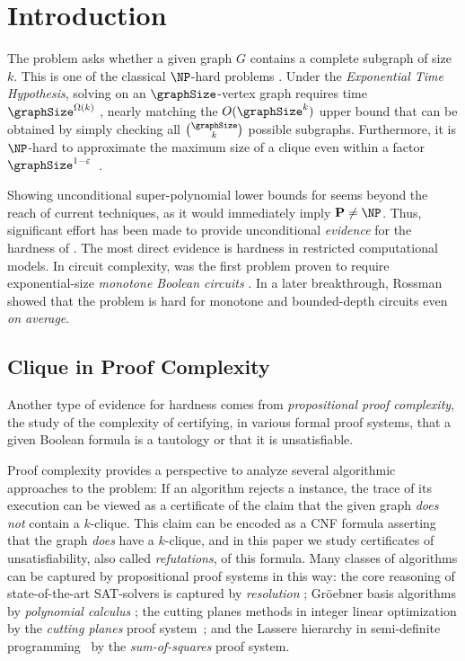 \section{Introduction}
\label{sec:introduction}

The \kClique problem asks whether a given graph $G$ contains 
a complete subgraph of size $k$.
This is one of the classical $\NP$-hard problems \cite{Karp1972}.
Under the \emph{Exponential Time Hypothesis},
solving \kClique on an $\graphSize$-vertex graph requires time $\graphSize^{\Omega(k)}$ \cite{CHKX04approx}, nearly matching the $O(\graphSize^k)$ upper bound that can be obtained by simply checking all $\binom{\graphSize}{k}$ possible subgraphs.
Furthermore, it is $\NP$-hard to approximate the maximum size of a clique even within a factor $\graphSize^{1-\varepsilon}$~\cite{haastad1999clique, Zuckerman07}.

Showing unconditional super-polynomial lower bounds for \kClique seems beyond the reach of current techniques, as it would immediately imply $\mathbf{P} \neq \NP$. Thus, significant effort has been made to provide unconditional \emph{evidence} for the hardness of \kClique. The most direct evidence is hardness in restricted computational models. 
In circuit complexity, 
\kClique was the first 
problem proven to require exponential-size \emph{monotone Boolean circuits} \cite{Razborov1985}. 
In a later breakthrough, Rossman \cite{Rossman08ConstantDepth, Rossman14Monotone} showed 
that the \kClique problem is hard for monotone and bounded-depth circuits even \emph{on average}. 
\subsection{Clique in Proof Complexity}
Another type of evidence for hardness comes from \emph{propositional proof complexity},
the study of 
the complexity of certifying, in various formal proof systems, that a given Boolean formula is a tautology or that it is unsatisfiable.

Proof complexity provides a perspective to analyze several algorithmic approaches to the \kClique problem:
If an algorithm rejects a \kClique instance, 
the trace of its execution can be viewed as a certificate 
of the claim that the given graph \emph{does not} contain a $k$-clique.
This claim can be encoded as a CNF formula asserting that the graph \emph{does} have a $k$-clique, and in this paper we  study certificates of unsatisfiability, also called \emph{refutations}, of this formula.  
Many classes of algorithms can be captured by propositional proof systems in this way: the core reasoning of state-of-the-art 
SAT-solvers is captured by \emph{resolution} \cite{BKS04}; Gr\"oebner basis algorithms by \emph{polynomial calculus} \cite{CEI96}; the cutting planes methods in integer linear optimization by the \emph{cutting planes} proof system~\cite{CCT87ComplexityCP};
and the Lassere hierarchy in semi-definite programming~\cite{Lasserre01} by the \emph{sum-of-squares} proof system. 

